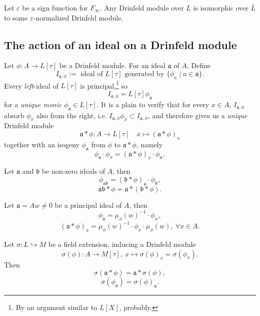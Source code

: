 \documentclass{article}
\begin{document}
\begin{lemma}
    Let $\varepsilon$ be a sign function for $F_\infty$.
    Any Drinfeld module over $L$ is isomorphic over $\bar L$ to some $\varepsilon$-normalized Drinfeld module.
\end{lemma}


\subsection{The action of an ideal on a Drinfeld module}
Let $\phi : A\to L[\tau]$ be a Drinfeld module.
For an ideal $\mathfrak{a}$ of $A$, Define 
\[I_{\mathfrak{a}, \phi} := \text{ ideal of } L[\tau] \text{ generated by } \{\phi_a\mid a\in\mathfrak{a}\}.\]
Every \textit{left}-ideal of $L[\tau]$ is principal,\footnote{
    By an argument similar to $L[X]$, probably.
}
so \[I_{\mathfrak{a}, \phi} = L[\tau]\phi_{\mathfrak{a}}\]
for a \textit{unique monic} $\phi_\mathfrak{a}\in L[\tau]$.
It is a plain to verify that for every $x\in A$,
$I_{\mathfrak{a}, \phi}$ absorb $\phi_x$ also from the right,
i.e. $I_{\mathfrak{a}, \phi}\phi_x\subset I_{\mathfrak{a}, \phi}$,
and therefore gives us a \textit{unique} Drinfeld module \[\mathfrak{a}*\phi : A\to L[\tau]\quad x\mapsto (\mathfrak{a}*\phi)_x\]
together with an isogeny
$\phi_\mathfrak{a}$ from $\phi$ to $\mathfrak{a}*\phi$,
namely \[\phi_\mathfrak{a}\cdot \phi_x = (\mathfrak{a}*\phi)_x\cdot\phi_\mathfrak{a},\]

\begin{lemma}\label{action on a Drinfeld module by an ideal}
    Let $\mathfrak{a}$ and $\mathfrak{b}$ be non-zero ideals of $A$,
    then\[
    \phi_{\mathfrak{ab}} = (\mathfrak{b}*\phi)_\mathfrak{a}\cdot \phi_{\mathfrak{b}},\]
    \[\mathfrak{ab}*\phi = \mathfrak{a}*(\mathfrak{b}*\phi).\]
\end{lemma}
\begin{lemma}\label{action on a Drinfeld module by a principal ideal}
    Let $\mathfrak{a} = Aw\ne 0$ be a principal ideal of $A$,
    then \[
    \phi_\mathfrak{a} = \mu_\phi(w)^{-1}\cdot\phi_w,\]
    \[
    (\mathfrak{a}*\phi)_x = \mu_\phi(w)^{-1}\cdot\phi_x\cdot\mu_\phi(w),\ \forall x\in A.\]
\end{lemma}
\begin{lemma}\label{action on a Drinfeld module by an ideal commutes with field extension}
    Let $\sigma : L\hookrightarrow M$ be a field extension, inducing a Drinfeld module \[\sigma(\phi) : A\to M[\tau],\ x\mapsto \sigma(\phi)_x = \sigma(\phi_x).\]
    Then \[\sigma(\mathfrak{a}*\phi) = \mathfrak{a} * \sigma(\phi),\]
    \[\sigma(\phi_\mathfrak{a}) = \sigma(\phi)_\mathfrak{a}.\]
\end{lemma}
\end{document}
